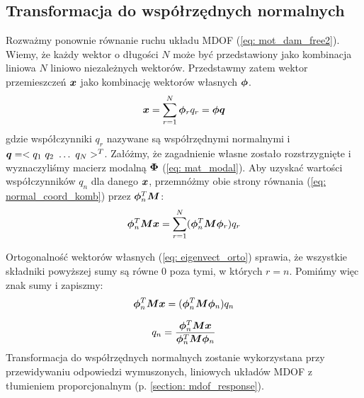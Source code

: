 \subsection{Transformacja do współrzędnych normalnych} \label{section: transform_normal}
Rozważmy ponownie równanie ruchu układu MDOF (\ref{eq: mot_dam_free2}). Wiemy, że każdy wektor o długości $N$ może być przedstawiony jako kombinacja liniowa $N$ liniowo niezależnych wektorów. Przedstawmy zatem wektor przemieszczeń $\bm{x}$ jako kombinację wektorów własnych $\bm{\phi}$.
\begin{equation} \label{eq: normal_coord_komb}
	\bm{x} = \sum_{r=1}^{N} \bm{\phi}_r q_r=\bm{\phi q}
\end{equation} 
gdzie współczynniki $q_r$ nazywane są współrzędnymi normalnymi  i $\bm{q}=<q_1\,\,q_2\,\, \dots\,\, q_N>^T$. Załóżmy, że zagadnienie własne zostało rozstrzygnięte i wyznaczyliśmy macierz modalną $\bm{\Phi}$ (\ref{eq: mat_modal}). Aby uzyskać wartości współczynników $q_n$ dla danego $\bm{x}$, przemnóżmy obie strony równania (\ref{eq: normal_coord_komb}) przez $\bm{\phi}_n^T\bm{M}$:
\begin{equation} \label{eq: normal_coord_komb2}
	\bm{\phi}_n^T\bm{M}\bm{x} = \sum_{r=1}^{N} (\bm{\phi}_n^T\bm{M}\bm{\phi}_r) q_r
\end{equation} 

Ortogonalność wektorów własnych (\ref{eq: eigenvect_orto}) sprawia, że wszystkie składniki powyższej sumy są równe 0 poza tymi, w których $r=n$. Pomińmy więc znak sumy i zapiszmy:
\begin{equation} \label{eq: normal_coord_kom3}
	\bm{\phi}_n^T\bm{M}\bm{x} = (\bm{\phi}_n^T\bm{M}\bm{\phi}_n) q_n
\end{equation} 

\begin{equation} \label{eq: normal_coord_kom4}
	q_n = \frac{\bm{\phi}_n^T\bm{M}\bm{x}}{\bm{\phi}_n^T\bm{M}\bm{\phi}_n} 
\end{equation} 
Transformacja do współrzędnych normalnych zostanie wykorzystana przy przewidywaniu odpowiedzi wymuszonych, liniowych układów MDOF z tłumieniem proporcjonalnym (p. \ref{section: mdof_response}).

